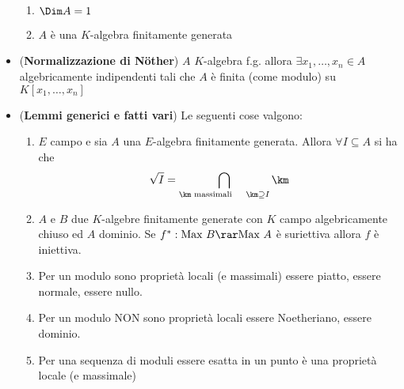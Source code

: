 \documentclass[a4paper,NoNotes,GeneralMath]{stdmdoc}
\newcommand{\Max}{\text{Max }}
\begin{document}
\begin{itemize}
\begin{enumerate}
  \item $\Dim A = 1$
  \item $A$ è una $K$-algebra finitamente generata
  \end{enumerate}
\item ({\bf Normalizzazione di Nöther}) $A$ $K$-algebra f.g. allora
  $\exists x_1, \ldots, x_n \in A$ algebricamente indipendenti tali che
  $A$ è finita (come modulo) su $K[x_1, \ldots, x_n]$
\item ({\bf Lemmi generici e fatti vari}) Le seguenti cose valgono:
  \begin{enumerate}
  \item $E$ campo e sia $A$ una $E$-algebra finitamente generata. Allora
    $\forall I \subseteq A$ si ha che
    $$\sqrt{I} = \bigcap_{\km \text{ massimali } \quad \km \supseteq I} \km$$
  \item $A$ e $B$ due $K$-algebre finitamente generate con $K$ campo
    algebricamente chiuso ed $A$ dominio. Se $f^*: \Max B \rar \Max A$ è
    suriettiva allora $f$ è iniettiva.
  \item Per un modulo sono proprietà locali (e massimali) essere
    piatto, essere normale, essere nullo.
  \item Per un modulo NON sono proprietà locali essere Noetheriano,
    essere dominio.
  \item Per una sequenza di moduli essere esatta in un punto è una
    proprietà locale (e massimale)
  \end{enumerate}
\end{itemize}
\end{document}
